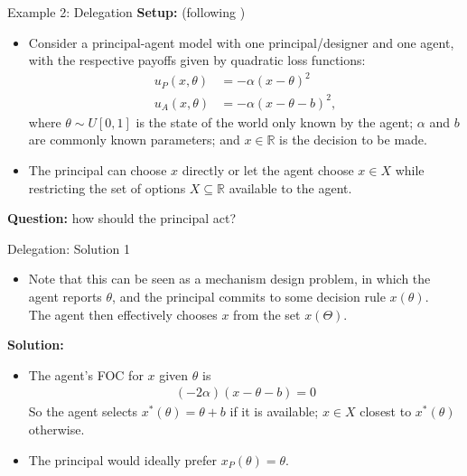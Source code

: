\documentclass[english,10pt
,aspectratio=169
]{beamer}
\begin{document}
\begin{frame}{Example 2: Delegation}
	\textbf{Setup:} (following \cite{holmstrom_theory_1980})
	\begin{itemize}
		\item Consider a principal-agent model with one principal/designer and one agent, with the respective payoffs given by quadratic loss functions:
		\begin{align*}
			u_P(x,\theta) &= - \alpha (x-\theta)^2
			\\
			u_A(x,\theta) &= - \alpha (x-\theta-b)^2,
		\end{align*}
		where $\theta \sim U[0,1]$ is the state of the world only known by the agent; $\alpha$ and $b$ are commonly known parameters; and $x \in \mathbb{R}$ is the decision to be made.
		\item The principal can choose $x$ directly or let the agent choose $x \in X$ while restricting the set of options $X \subseteq \mathbb{R}$ available to the agent.
	\end{itemize}
	\textbf{Question:} how should the principal act?
\end{frame}


\begin{frame}{Delegation: Solution 1}
	\begin{itemize}
		\item Note that this can be seen as a mechanism design problem, in which the agent reports $\theta$, and the principal commits to some decision rule $x(\theta)$. \\
		The agent then effectively chooses $x$ from the set $x(\Theta)$.
	\end{itemize}
	\textbf{Solution:}
	\begin{itemize}
		\item The agent's FOC for $x$ given $\theta$ is 
		\begin{align*}
			(-2\alpha) (x-\theta-b) = 0
		\end{align*}
		So the agent selects $x^*(\theta) = \theta+b$ if it is available; $x \in X$ closest to $x^*(\theta)$ otherwise.
		\item The principal would ideally prefer $x_P(\theta) = \theta$.
	\end{itemize}
\end{frame}
\end{document}
